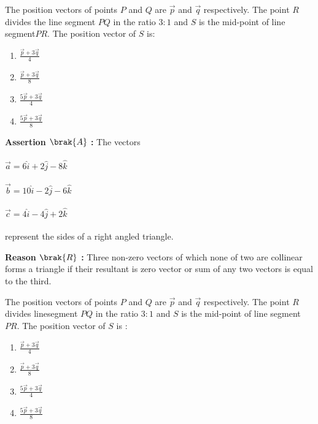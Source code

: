 \item The position vectors of points $P$ and $ Q $ are $\overrightarrow{p}$  and $\overrightarrow{q}$ respectively. The point $ R $ divides the line segment  $ PQ $ in the ratio $ 3:1 $  and $S$ is the mid-point of  line segment$ PR $. The position vector of $ S $ is:                                                                                                                \begin{enumerate}                     
\item $\frac{\overrightarrow {p} + 3\overrightarrow {q}}{4}$            
\item $\frac{\overrightarrow{p} + 3\overrightarrow{q}}{8}$              
\item $\frac{5\overrightarrow{p} + 3\overrightarrow{q}}{4}$             
\item $\frac{5\overrightarrow{p} + 3\overrightarrow{q}}{8}$         
\end{enumerate}   
    
\item 
\textbf{Assertion $\brak{A}$ :} The vectors \\ \\                           
$\overrightarrow{a}=6\hat{i}+2\hat{j}-8\hat{k}$ \\ \\                 
$\overrightarrow{b} = 10\hat{i}-2\hat{j}-6\hat{k}$  \\ \\               
$\overrightarrow{c} = 4\hat{i}-4\hat{j}+2\hat{k}$  \\ \\                      
represent the sides of a right angled triangle.                  
\item [] \textbf{Reason $\brak{R}$    :} Three non-zero vectors of which none of two are collinear forms a triangle if their resultant is  zero vector or sum of any two vectors is equal to the third.
\item The position vectors of points $P$ and $Q$ are $\vec{p}$ and $\vec{q}$ respectively. The point $R$ divides linesegment $PQ$ in the ratio $3 \colon 1$ and $S$ is the mid-point of line segment $PR$. The position vector of $S$ is :
	\begin{enumerate}
		\item $\frac{\vec{p} + 3\vec{q}}{4}$
		\item $\frac{\vec{p} + 3\vec{q}}{8}$
		\item $\frac{5\vec{p} + 3\vec{q}}{4}$
		\item $\frac{5\vec{p} + 3\vec{q}}{8}$
	\end{enumerate}
			

